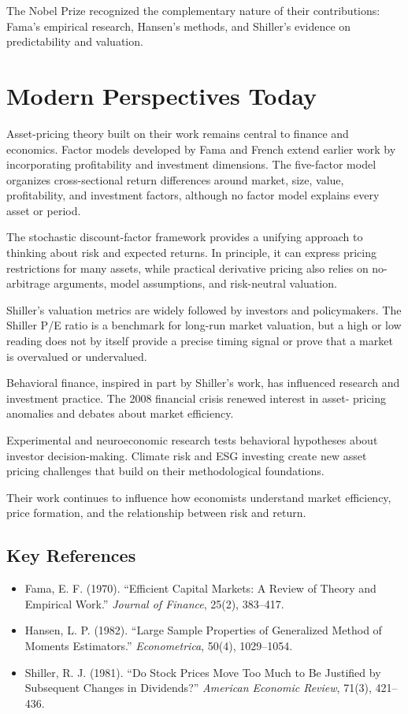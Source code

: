 The Nobel Prize recognized the complementary nature of their contributions:
Fama's empirical research, Hansen's methods, and Shiller's evidence on
predictability and valuation.

\section{Modern Perspectives Today}
Asset-pricing theory built on their work remains central to finance and economics.
Factor models developed by Fama and French extend earlier work by incorporating
profitability and investment dimensions. The five-factor model organizes
cross-sectional return differences around market, size, value, profitability, and
investment factors, although no factor model explains every asset or period.

The stochastic discount-factor framework provides a unifying approach to thinking
about risk and expected returns. In principle, it can express pricing restrictions
for many assets, while practical derivative pricing also relies on no-arbitrage
arguments, model assumptions, and risk-neutral valuation.

Shiller's valuation metrics are widely followed by investors and policymakers.
The Shiller P/E ratio is a benchmark for long-run market valuation, but a high or
low reading does not by itself provide a precise timing signal or prove that a
market is overvalued or undervalued.

Behavioral finance, inspired in part by Shiller's work, has influenced research
and investment practice. The 2008 financial crisis renewed interest in asset-
pricing anomalies and debates about market efficiency.

Experimental and neuroeconomic research tests behavioral hypotheses about
investor decision-making. Climate risk and ESG investing create new asset
pricing challenges that build on their methodological foundations.

Their work continues to influence how economists understand market efficiency,
price formation, and the relationship between risk and return.

\subsection*{Key References}
\begin{itemize}
    \item Fama, E. F. (1970). ``Efficient Capital Markets: A Review of Theory and Empirical Work.'' \textit{Journal of Finance}, 25(2), 383--417.
    \item Hansen, L. P. (1982). ``Large Sample Properties of Generalized Method of Moments Estimators.'' \textit{Econometrica}, 50(4), 1029--1054.
    \item Shiller, R. J. (1981). ``Do Stock Prices Move Too Much to Be Justified by Subsequent Changes in Dividends?'' \textit{American Economic Review}, 71(3), 421--436.
\end{itemize}
